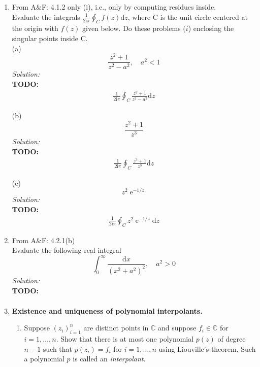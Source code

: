 \documentclass[10pt]{amsart}
\newcommand{\D}{\mathrm{d}}
\newcommand{\I}{\mathrm{i}}
\DeclareMathOperator{\E}{e}
\theoremstyle{nonumberplain}
\begin{document}
\mline
\begin{enumerate}[label={\bf {\arabic*}:}]
\item From A\&F: 4.1.2 only (i), i.e., only by computing residues inside.\\
Evaluate the integrals $\frac 1 {2 \I \pi} \oint_C f(z) \D z$, where C is the unit circle centered at the origin with $f(z)$ given below.
Do these problems ($i$) enclosing the singular points inside C. \\

\noindent
(a)
$$
\frac {z^2 + 1}{ z^2 - a^2 }, \quad a^2 < 1
$$
\textit{Solution:} \\
\textbf{TODO:}
\begin{align*}
\frac 1 {2 \I \pi} \oint_C \frac {z^2 + 1}{ z^2 - a^2 } \D z
\end{align*}

\noindent
(b)
$$
\frac {z^2 + 1}{ z^3 }
$$
\textit{Solution:} \\
\textbf{TODO:}
\begin{align*}
\frac 1 {2 \I \pi} \oint_C \frac {z^2 + 1}{ z^3 } \D z
\end{align*}

\noindent
(c)
$$
z^2\E^{-1/z}
$$
\textit{Solution:} \\
\textbf{TODO:}
\begin{align*}
\frac 1 {2 \I \pi} \oint_C z^2\E^{-1/z} \D z
\end{align*}

\newpage


\item From A\&F: 4.2.1(b)\\
Evaluate the following real integral
$$
\int_0^\infty \frac {\D x}{ (x^2 + a^2)^2 }, \quad a^2 > 0
$$
\textit{Solution:} \\
\textbf{TODO:}
\begin{align*}
\end{align*}

\newpage


\item  \textbf{Existence and uniqueness of polynomial interpolants.}
\begin{enumerate}
\item Suppose $(z_i)_{i = 1}^n$ are distinct points in $\mathbb C$ and suppose $f_i \in \mathbb C$ for $i = 1,\ldots,n$.
Show that there is at most one polynomial $p(z)$ of degree $n-1$ such that $p(z_i) = f_i$ for $i = 1,\ldots,n$ using Liouville's theorem.
Such a polynomial $p$ is called an \emph{interpolant}. \\


\end{enumerate}
\end{enumerate}
\end{document}
